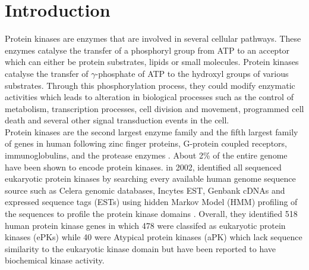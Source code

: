 \documentclass[a4paper, 11pt]{article}
\begin{document}

\section*{Introduction}
Protein kinases are enzymes that are involved in several cellular pathways. These enzymes catalyse the transfer of a phosphoryl group from ATP to an acceptor which  can either be protein substrates, lipids or small molecules. Protein kinases catalyse the transfer of $\gamma$-phosphate of ATP to the hydroxyl groups of various substrates. Through this phosphorylation process, they could modify enzymatic activities which leads to alteration in biological processes such as the control of metabolism, transcription processes, cell division and movement, programmed cell death and several other signal transduction events in the cell. \\
Protein kinases are the second largest enzyme family and the fifth largest family of genes in human following zinc finger proteins, G-protein coupled receptors, immunoglobulins, and the protease enzymes \cite{roskoski2016classification}. About 2\% of the entire genome have been shown to encode protein kinases. \cite{manning2002protein} in 2002, identified all sequenced eukaryotic protein kinases by searching every available human genome sequence source such as  Celera genomic databases, Incytes EST, Genbank cDNAs and expressed sequence tags (ESTs) using hidden Markov Model (HMM) profiling of the sequences to profile the protein kinase domains \cite{manning2002protein}. Overall, they identified 518 human protein kinase genes in which 478 were classifed as eukaryotic protein kinases (ePKs) while 40 were Atypical protein kinases (aPK) which lack sequence similarity to the eukaryotic kinase domain but have been reported to have biochemical kinase activity.
\end{document}
